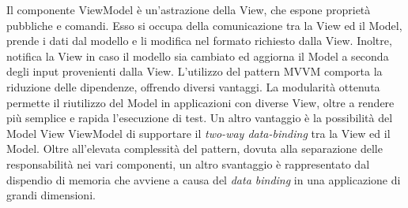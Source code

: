 			Il componente ViewModel è un'astrazione della View, che espone proprietà pubbliche e comandi. Esso si occupa della comunicazione tra la View ed il Model, prende i dati dal modello e li modifica nel formato richiesto dalla View. Inoltre, notifica la View in caso il modello sia cambiato ed aggiorna il Model a seconda degli input provenienti dalla View.
		L'utilizzo del pattern MVVM comporta la riduzione delle dipendenze, offrendo diversi vantaggi. La modularità ottenuta permette il riutilizzo del Model in applicazioni con diverse View, oltre a rendere più semplice e rapida l'esecuzione di test. 
		Un altro vantaggio è la possibilità del Model View ViewModel di supportare il \textit{two-way data-binding} tra la View ed il Model.
		Oltre all'elevata complessità del pattern, dovuta alla separazione delle responsabilità nei vari componenti, un altro svantaggio è rappresentato dal dispendio di memoria che avviene a causa del \textit{data binding} in una applicazione di grandi dimensioni.


